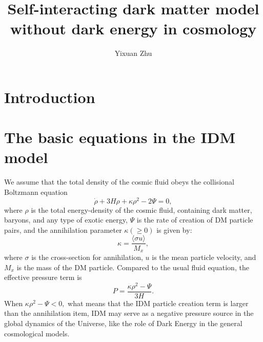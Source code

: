 \documentclass[twocolumn]{aastex631}
\begin{document}
 

   \title{Self-interacting dark matter model without dark energy in cosmology}

   \author{Yixuan Zhu}
 
   \begin{abstract}

   \end{abstract}
   
   \keywords{}

\section{Introduction}

\section{The basic equations in the IDM model}

   We assume that the total density of the cosmic fluid obeys
   the collisional Boltzmann equation
   \begin{equation}
      \dot{\rho}+3H\rho+\kappa\rho^2-2\Psi=0,
   \end{equation}
   where $\rho$ is the total energy-density of the cosmic fluid,
   containing dark matter, baryons, and any type of exotic energy,
   $\Psi$ is the rate of creation of DM particle pairs, and the
   annihilation parameter $\kappa(\geq0)$ is given by:
   \begin{equation}
      \kappa=\frac{\langle\sigma u\rangle}{M_x},\label{eq:2}
   \end{equation}
   where $\sigma$ is the cross-section for annihilation, $u$ is
   the mean particle velocity, and $M_x$ is the mass of the DM
   particle.
   Compared to the usual fluid equation, the effective pressure term
   is \begin{equation}
      P=\frac{\kappa\rho^2-\Psi}{3H}.
   \end{equation}
   When $\kappa\rho^2-\Psi<0,$ what means that the IDM particle
   creation term is larger than the annihilation item, IDM may serve
   as a negative pressure source in the global dynamics of the Universe,
   like the role of Dark Energy in the general cosmological models.
\end{document}
